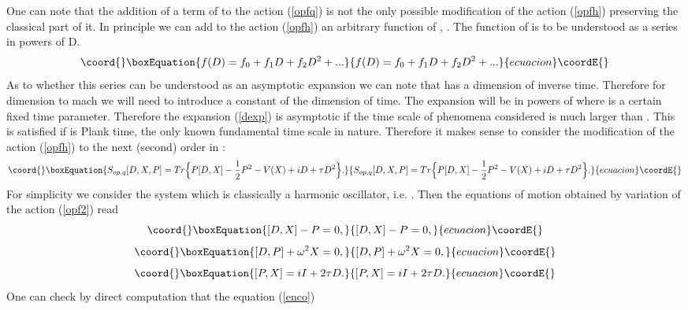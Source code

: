 \documentclass[a4paper,11pt]{article}
\begin{document}
 One can note that the addition of a term of \coordHE{} to
the action (\ref{opfq}) is not the only possible modification of
the action (\ref{opfh}) preserving the classical part of it. In
principle we can add to the action (\ref{opfh}) an arbitrary
function of \coordHE{}, \coordHE{}. The function of \coordHE{} is to be understood
as a series in powers of D.
\begin{equation}\coord{}\boxEquation{
f(D)=f_0 +f_1 D +f_2 D^2 + ... \label{dexp}
}{
f(D)=f_0 +f_1 D +f_2 D^2 + ... }{ecuacion}\coordE{}\end{equation}
As to whether this series can be understood as an asymptotic
expansion we can note that \coordHE{} has a dimension of inverse time.
Therefore for dimension to mach we will need to introduce a
constant of the dimension of time. The expansion will be in powers
of \coordHE{} where \myHighlight{$\tau$}\coordHE{} is a certain fixed time parameter.
Therefore the expansion (\ref{dexp}) is asymptotic if the time
scale of phenomena considered is much larger than \myHighlight{$\tau$}\coordHE{}. This is
satisfied if \myHighlight{$\tau$}\coordHE{} is Plank time, the only known fundamental time
scale in nature. Therefore it makes sense to consider the
modification of the action (\ref{opfh}) to the next (second) order
in \coordHE{}:
\begin{equation}\coord{}\boxEquation{
S_{op,q}[D,X,P]=Tr \Big\{ P[D,X]-\frac{1}{2}P^2 - V(X)+iD+\tau D^2
\Big\}. \label{opf2}
}{
S_{op,q}[D,X,P]=Tr \Big\{ P[D,X]-\frac{1}{2}P^2 - V(X)+iD+\tau D^2
\Big\}. }{ecuacion}\coordE{}\end{equation}
For simplicity we consider the system which is classically a
harmonic oscillator, i.e. \coordHE{}. Then the equations
of motion obtained by variation of the action (\ref{opf2}) read
\begin{equation}\coord{}\boxEquation{
[D,X]-P=0, \label{em21}
}{
[D,X]-P=0, }{ecuacion}\coordE{}\end{equation}
\begin{equation}\coord{}\boxEquation{
[D,P] + \omega^2 X=0, \label{em22}
}{
[D,P] + \omega^2 X=0, }{ecuacion}\coordE{}\end{equation}
\begin{equation}\coord{}\boxEquation{
[P,X]=iI+2\tau D. \label{em23}
}{
[P,X]=iI+2\tau D. }{ecuacion}\coordE{}\end{equation}
One can check by direct computation that the equation (\ref{enco})
\end{document}
